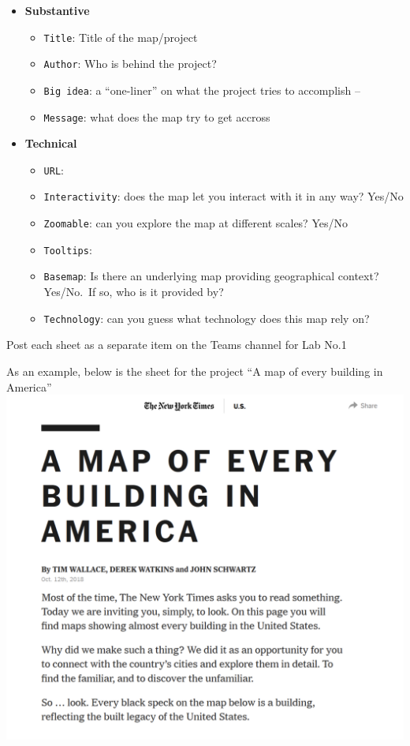 \documentclass[
  letterpaper,
  DIV=11,
  numbers=noendperiod]{scrreprt}
\providecommand{\tightlist}{%
  \setlength{\itemsep}{0pt}\setlength{\parskip}{0pt}}\usepackage{longtable,booktabs,array}
\begin{document}
\begin{itemize}
\item
  \textbf{Substantive}

  \begin{itemize}
  \tightlist
  \item
    \texttt{Title}: Title of the map/project
  \item
    \texttt{Author}: Who is behind the project?
  \item
    \texttt{Big\ idea}: a ``one-liner'' on what the project tries to
    accomplish --
  \item
    \texttt{Message}: what does the map try to get accross
  \end{itemize}
\item
  \textbf{Technical}

  \begin{itemize}
  \tightlist
  \item
    \texttt{URL}:
  \item
    \texttt{Interactivity}: does the map let you interact with it in any
    way? Yes/No
  \item
    \texttt{Zoomable}: can you explore the map at different scales?
    Yes/No
  \item
    \texttt{Tooltips}:
  \item
    \texttt{Basemap}: Is there an underlying map providing geographical
    context? Yes/No.~If so, who is it provided by?
  \item
    \texttt{Technology}: can you guess what technology does this map
    rely on?
  \end{itemize}
\end{itemize}

Post each sheet as a separate item on the Teams channel for Lab No.1

As an example, below is the sheet for the project ``A map of every
building in America'' \includegraphics{././img/buildamerica.png}
\end{document}
